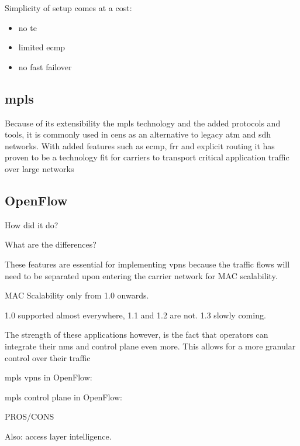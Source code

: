 Simplicity of setup comes at a cost:
\begin{itemize}
	\item no \ac{te}
	\item limited \ac{ecmp}
	\item no fast failover
\end{itemize}


\subsection{\acs{mpls}} %
\label{sub:mpls}

Because of its extensibility the \ac{mpls} technology and the added protocols and tools, it is commonly used in \acp{cen} as an alternative to legacy \acs{atm} and \acs{sdh} networks. With added features such as \ac{ecmp}, \ac{frr} and explicit routing it has proven to be a technology fit for carriers to transport critical application traffic over large networks





\subsection{OpenFlow} %
\label{sub:openflow}

How did it do?

What are the differences?



These features are essential for implementing \acp{vpn} because the traffic flows will need to be separated upon entering the carrier network for MAC scalability.

MAC Scalability only from 1.0 onwards.

1.0 supported almost everywhere, 1.1 and 1.2 are not. 1.3 slowly coming.

The strength of these applications however, is the fact that operators can integrate their \ac{nms} and control plane even more. This allows for a more granular control over their traffic

\ac{mpls} \acp{vpn} in OpenFlow: \cite{mpls-vpn-openflow}

\ac{mpls} control plane in OpenFlow: \cite{mpls-open}


PROS/CONS


Also: access layer intelligence.

